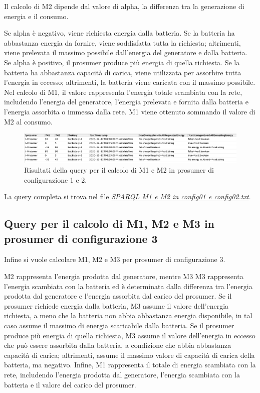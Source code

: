 Il calcolo di M2 dipende dal valore di alpha, la differenza tra la generazione di energia e il consumo.

Se alpha è negativo, viene richiesta energia dalla batteria. Se la batteria ha abbastanza energia da fornire, viene soddisfatta tutta la richiesta; altrimenti, viene prelevata il massimo possibile dall'energia del generatore e dalla batteria.
Se alpha è positivo, il prosumer produce più energia di quella richiesta. Se la batteria ha abbastanza capacità di carica, viene utilizzata per assorbire tutta l'energia in eccesso; altrimenti, la batteria viene caricata con il massimo possibile.
Nel calcolo di M1, il valore rappresenta l'energia totale scambiata con la rete, includendo l'energia del generatore, l'energia prelevata e fornita dalla batteria e l'energia assorbita o immessa dalla rete.
M1 viene ottenuto sommando il valore di M2 al consumo.

\begin{figure}[H]
    \centering
    \includegraphics[width=15cm]{images/query_m1m2_config0102_res.png}
    \caption{Risultati della query per il calcolo di M1 e M2 in prosumer di configurazione 1 e 2.}
    \label{fig:query_m1_m2_res}
\end{figure}

La query completa si trova nel file \href{https://github.com/19eddie/SemanticWeb-Assignment02-03/blob/main/SPARQL%20M1%20e%20M2%20in%20config01%20e%20config02.txt}{\textit{SPARQL M1 e M2 in config01 e config02.txt}}.

\subsection{Query per il calcolo di M1, M2 e M3 in prosumer di configurazione 3}

Infine si vuole calcolare M1, M2 e M3 per prosumer di configurazione 3.

M2 rappresenta l'energia prodotta dal generatore, mentre M3 M3 rappresenta l'energia scambiata con la batteria ed è determinata dalla differenza tra l'energia prodotta dal generatore e l'energia assorbita dal carico del prosumer.
Se il prosumer richiede energia dalla batteria, M3 assume il valore dell'energia richiesta, a meno che la batteria non abbia abbastanza energia disponibile, in tal caso assume il massimo di energia scaricabile dalla batteria. Se il prosumer produce più energia di quella richiesta,
M3 assume il valore dell'energia in eccesso che può essere assorbita dalla batteria, a condizione che abbia abbastanza capacità di carica; altrimenti, assume il massimo valore di capacità di carica della batteria, ma negativo.
Infine, M1 rappresenta il totale di energia scambiata con la rete, includendo l'energia prodotta dal generatore, l'energia scambiata con la batteria e il valore del carico del prosumer.


